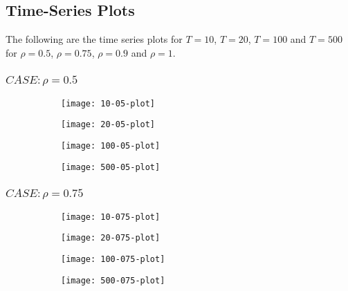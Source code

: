 \subsection{Time-Series Plots}

The following are the time series plots for $ T = 10$, $ T = 20$, $ T = 100$ and $ T = 500$ for $\rho = 0.5$, $\rho = 0.75$, $\rho = 0.9$ and $\rho = 1$.

\subsubsection{$CASE: \rho = 0.5$}

\begin{figure}[htp]
	\centering
	\begin{subfigure}{0.23\textwidth}
		\centering
		\texttt{[image: 10-05-plot]}
	\end{subfigure}
	\begin{subfigure}{0.23\textwidth}
		\centering
		\texttt{[image: 20-05-plot]}
	\end{subfigure}
	\begin{subfigure}{0.23\textwidth}
		\centering
		\texttt{[image: 100-05-plot]}
	\end{subfigure}
	\begin{subfigure}{0.23\textwidth}
		\centering
		\texttt{[image: 500-05-plot]}
	\end{subfigure}
\end{figure}

\subsubsection{$CASE: \rho = 0.75$}

\begin{figure}[htp]
	\centering
	\begin{subfigure}{0.23\textwidth}
		\centering
		\texttt{[image: 10-075-plot]}
	\end{subfigure}
	\begin{subfigure}{0.23\textwidth}
		\centering
		\texttt{[image: 20-075-plot]}
	\end{subfigure}
	\begin{subfigure}{0.23\textwidth}
		\centering
		\texttt{[image: 100-075-plot]}
	\end{subfigure}
	\begin{subfigure}{0.23\textwidth}
		\centering
		\texttt{[image: 500-075-plot]}
	\end{subfigure}
\end{figure}

